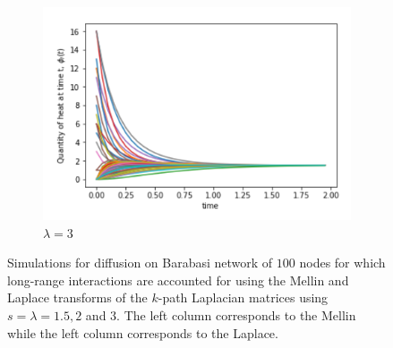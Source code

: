 \documentclass[10pt,a4paper]{article}
\begin{document}
\begin{figure}[H]
\begin{subfigure}[b]{0.45\textwidth}
        		\includegraphics[width= \textwidth]{images/Barabasi-Laplace3.png}
        		\caption{$\lambda=3$}
        	\end{subfigure}
        	\caption{Simulations for diffusion on Barabasi  network of $100$ nodes for which long-range interactions are accounted for using the Mellin and Laplace transforms of the $k$-path Laplacian matrices using $s=\lambda=1.5,2$ and $3$. The left column corresponds to the Mellin while the left column corresponds to the Laplace.}
        	\label{barabasi-Mellin-Laplace}
        \end{figure}
         
\end{document}
